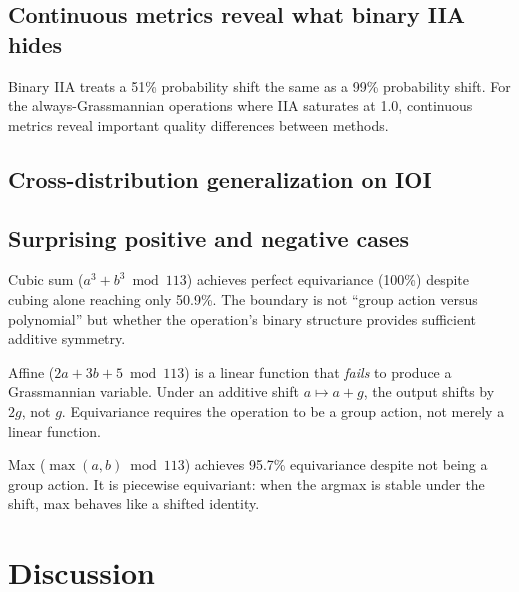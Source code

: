 \documentclass{article}
\begin{document}
\subsection{Continuous metrics reveal what binary IIA hides}
\label{sec:continuous_metrics}

Binary IIA treats a 51\% probability shift the same as a 99\% probability shift.
For the always-Grassmannian operations where IIA saturates at 1.0, continuous
metrics reveal important quality differences between methods.


\subsection{Cross-distribution generalization on IOI}
\label{sec:cross_dist_results}


\subsection{Surprising positive and negative cases}

Cubic sum ($a^3 + b^3 \bmod 113$) achieves perfect equivariance (100\%) despite
cubing alone reaching only 50.9\%. The boundary is not ``group action versus
polynomial'' but whether the operation's binary structure provides sufficient
additive symmetry.

Affine ($2a + 3b + 5 \bmod 113$) is a linear function that \emph{fails} to
produce a Grassmannian variable. Under an additive shift $a \mapsto a + g$, the
output shifts by $2g$, not $g$. Equivariance requires the operation to be a group
action, not merely a linear function.

Max ($\max(a,b) \bmod 113$) achieves 95.7\% equivariance despite not being a
group action. It is piecewise equivariant: when the argmax is stable under the
shift, max behaves like a shifted identity.


\section{Discussion}
\label{sec:discussion}
\end{document}
